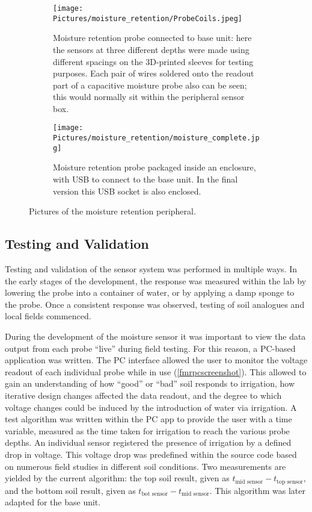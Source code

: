 \begin{figure}[H]
\centering
\begin{subfigure}[t]{0.6\textwidth}
	\texttt{[image: Pictures/moisture\_retention/ProbeCoils.jpeg]}
	\captionsetup{justification = centering}
	\caption{Moisture retention probe connected to base unit: here the sensors at three different depths were made using different spacings on the 3D-printed sleeves for testing purposes. Each pair of wires soldered onto the readout part of a capacitive moisture probe also can be seen; this would normally sit within the peripheral sensor box.}
\end{subfigure}
\begin{subfigure}[t]{0.35\textwidth}
		\texttt{[image: Pictures/moisture\_retention/moisture\_complete.jpg]}
	\captionsetup{justification = centering}
	\caption{Moisture retention probe packaged inside an enclosure, with \gls{USB} to connect to the base unit. In the final version this \gls{USB} socket is also enclosed.}
\end{subfigure}
\caption{Pictures of the moisture retention peripheral.}
	\label{ffieldtest2b}
\end{figure}


\subsection{Testing and Validation}
Testing and validation of the sensor system was performed in multiple ways. In the early stages of the development, the response was measured within the lab by lowering the probe into a container of water, or by applying a damp sponge to the probe. Once a consistent response was observed, testing of soil analogues and local fields commenced.

During the development of the moisture sensor it was important to view the data output from each probe \enquote{live} during field testing. For this reason, a PC-based application was written. The PC interface allowed the user to monitor the voltage readout of each individual probe while in use (\cref{fmrpcscreenshot}). This allowed to gain an understanding of how \enquote{good} or \enquote{bad} soil responds to irrigation, how iterative design changes affected the data readout, and the degree to which voltage changes could be induced by the introduction of water via irrigation. A test algorithm was written within the PC app to provide the user with a time variable, measured as the time taken for irrigation to reach the various probe depths. An individual sensor registered the presence of irrigation by a defined drop in voltage. This voltage drop was predefined within the source code based on numerous field studies in different soil conditions. Two measurements are yielded by the current algorithm: the top soil result, given as $t_\text{mid sensor} - t_\text{top sensor}$, and the bottom soil result, given as $t_\text{bot sensor} - t_\text{mid sensor}$. This algorithm was later adapted for the base unit.

